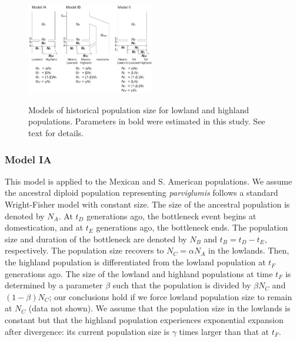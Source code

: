 \begin{figure}[tb]   
  \begin{center}
   \vspace{-0mm}
   \includegraphics[width=0.5\textwidth]{fig/Fig3}
   \renewcommand{\baselinestretch}{0.9}
   \vspace{-3mm}
   \caption{  Models of historical population size for lowland and highland populations.  Parameters in bold were estimated in this study.  See text for details.
   }
\vspace{-6mm}
    \label{model}
  \end{center}
\end{figure}

\subsubsection{Model IA}
This model is applied to the Mexican and S. American populations.
We assume the ancestral diploid population representing \emph{parviglumis} follows a standard Wright-Fisher model with constant size.  
The size of the ancestral population is denoted by $N_A$.
At $t_D$ generations ago, the bottleneck event begins at domestication, and at $t_E$ generations ago, the bottleneck ends.  
The population size and duration of the bottleneck are denoted by $N_B$ and $t_B=t_D-t_E$, respectively.  
The population size recovers to $N_C=\alpha N_A$ in the lowlands.  
Then, the highland population is differentiated from the lowland population at $t_F$ generations ago.  
The size of the lowland and highland populations at time $t_F$ is determined by a parameter $\beta$ such that the population is divided by $\beta N_C$ and $(1-\beta)N_C$; our conclusions hold if we force lowland population size to remain at $N_C$ (data not shown).  
We assume that the population size in the lowlands is constant but that the highland population experiences exponential expansion after divergence: its current population size is $\gamma$ times larger than that at $t_F$. \\

